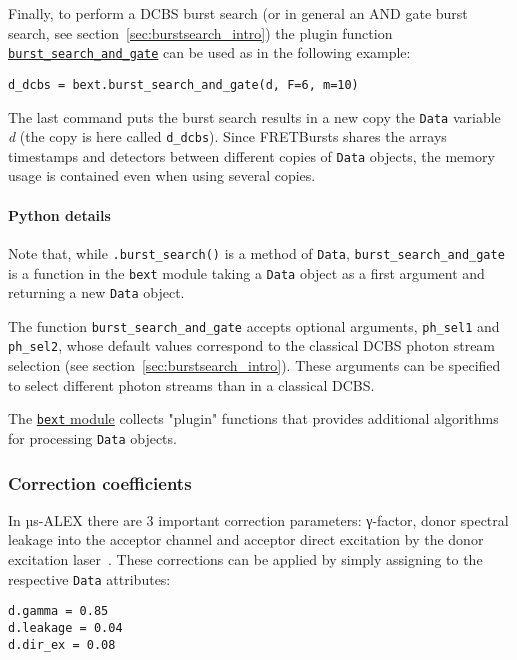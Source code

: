 Finally, to perform a DCBS burst search (or in general an AND gate burst search,
see section~\ref{sec:burstsearch_intro}) the plugin function
\href{http://fretbursts.readthedocs.org/en/latest/plugins.html#fretbursts.burstlib\_ext.burst\_search\_and\_gate}{\texttt{burst\_search\_and\_gate}}
can be used as in the following example:

\begin{lstlisting}
d_dcbs = bext.burst_search_and_gate(d, F=6, m=10)
\end{lstlisting}

The last command puts the burst search results in a new copy the \verb|Data| variable \textit{d}
(the copy is here called \verb|d_dcbs|).
Since FRETBursts shares the arrays timestamps and detectors between
different copies of \verb|Data| objects, the memory usage is contained even when using 
several copies. 

\paragraph{Python details}
Note that, while \verb|.burst_search()| is a method of \verb|Data|,
\verb|burst_search_and_gate| is a function in the \verb|bext| module
taking a \verb|Data| object as a first argument and returning a new
\verb|Data| object.

The function \verb|burst_search_and_gate| accepts optional arguments,
\verb|ph_sel1| and \verb|ph_sel2|, whose default values correspond to the
classical DCBS photon stream selection (see section~\ref{sec:burstsearch_intro}).
These arguments can be specified to select different photon streams than in
a classical DCBS.

The \href{http://fretbursts.readthedocs.org/en/latest/plugins.html}{\texttt{bext} module} 
collects "plugin" functions that provides additional algorithms 
for processing \verb|Data| objects. 

\subsubsection{Correction coefficients}
\label{sec:corrcoeff}

In µs-ALEX there are 3 important correction parameters: γ-factor, donor spectral
leakage into the acceptor channel and acceptor direct excitation by the donor excitation
laser~\cite{Lee_2005}.
These corrections can be applied by simply assigning to the respective \verb|Data| attributes:

\begin{lstlisting}
d.gamma = 0.85
d.leakage = 0.04
d.dir_ex = 0.08
\end{lstlisting}


